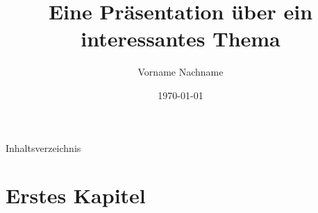 \documentclass{beamer} %
\title{Eine Präsentation über ein interessantes Thema}
\author{Vorname Nachname}
\institute{Ludwig-Maximilians-Universität München \\ Name des Instituts %
}
\date{\today} %
\begin{document}

\begin{frame} %
\titlepage %
\end{frame} %


 \begin{frame}{Inhaltsverzeichnis} %
 \tableofcontents %
 \end{frame}


\section{Erstes Kapitel} %

\end{document}
